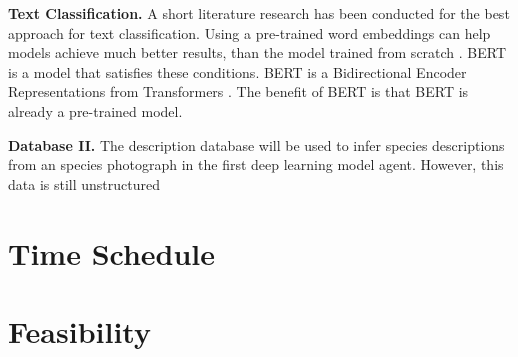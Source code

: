 \documentclass{article}
\begin{document}
\noindent
\textbf{Text Classification.}
A short literature research has been conducted for the best approach for text classification.
Using a pre-trained word embeddings can help models achieve much better results, than the model trained from scratch \cite{mikolov_distributed_2013}.   
BERT is a model that satisfies these conditions.
BERT is a Bidirectional Encoder Representations from Transformers \cite{devlin_bert_2019}.
The benefit of BERT is that BERT is already a pre-trained model.
\newline

\noindent
\textbf{Database II.}
The description database will be used to infer species descriptions from an species photograph in the first deep learning model agent.
However, this data is still unstructured


\section{Time Schedule}
\section{Feasibility}

\printbibliography
\end{document}
